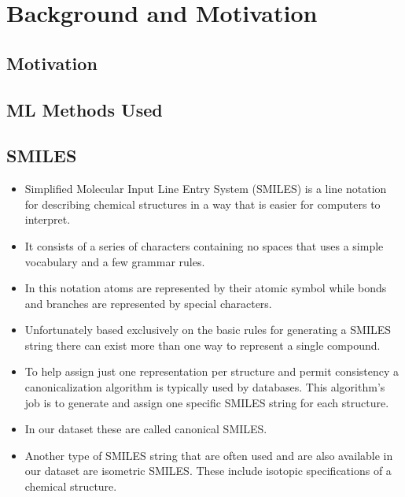 \section{Background and Motivation \label{background}}
\subsection{Motivation}
\subsection{ML Methods Used}
\subsection{SMILES}
    \begin{itemize}
        \item Simplified Molecular Input Line Entry System (SMILES) is a line notation for describing chemical structures in a way that is easier for computers to interpret. 
        \item It consists of a series of characters containing no spaces that uses a simple vocabulary and a few grammar rules.
        \item In this notation atoms are represented by their atomic symbol while bonds and branches are represented by special characters.
        \item Unfortunately based exclusively on the basic rules for generating a SMILES string there can exist more than one way to represent a single compound.
        \item To help assign just one representation per structure and permit consistency a canonicalization algorithm is typically used by databases. This algorithm's job is to generate and assign one specific SMILES string for each structure.
        \item In our dataset these are called canonical SMILES.
        \item Another type of SMILES string that are often used and are also available in our dataset are isometric SMILES. These include isotopic specifications of a chemical structure.
    \end{itemize}
